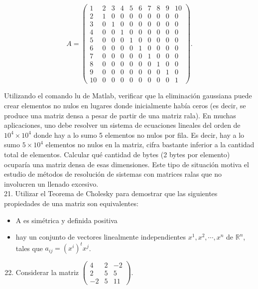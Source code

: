 \documentclass[10pt]{article}
\begin{document}
$$
A=\left(\begin{array}{rrrrrrrrrr}
1 & 2 & 3 & 4 & 5 & 6 & 7 & 8 & 9 & 10 \\
2 & 1 & 0 & 0 & 0 & 0 & 0 & 0 & 0 & 0 \\
3 & 0 & 1 & 0 & 0 & 0 & 0 & 0 & 0 & 0 \\
4 & 0 & 0 & 1 & 0 & 0 & 0 & 0 & 0 & 0 \\
5 & 0 & 0 & 0 & 1 & 0 & 0 & 0 & 0 & 0 \\
6 & 0 & 0 & 0 & 0 & 1 & 0 & 0 & 0 & 0 \\
7 & 0 & 0 & 0 & 0 & 0 & 1 & 0 & 0 & 0 \\
8 & 0 & 0 & 0 & 0 & 0 & 0 & 1 & 0 & 0 \\
9 & 0 & 0 & 0 & 0 & 0 & 0 & 0 & 1 & 0 \\
10 & 0 & 0 & 0 & 0 & 0 & 0 & 0 & 0 & 1
\end{array}\right) .
$$

Utilizando el comando lu de Matlab, verificar que la eliminación gaussiana puede crear elementos no nulos en lugares donde inicialmente había ceros (es decir, se produce una matriz densa a pesar de partir de una matriz rala). En muchas aplicaciones, uno debe resolver un sistema de ecuaciones lineales del orden de $10^{4} \times 10^{4}$ donde hay a lo sumo 5 elementos no nulos por fila. Es decir, hay a lo sumo $5 \times 10^{4}$ elementos no nulos en la matriz, cifra bastante inferior a la cantidad total de elementos. Calcular qué cantidad de bytes (2 bytes por elemento) ocuparía una matriz densa de esas dimensiones. Este tipo de situación motiva el estudio de métodos de resolución de sistemas con matrices ralas que no involucren un llenado excesivo.\\
21. Utilizar el Teorema de Cholesky para demostrar que las siguientes propiedades de una matriz son equivalentes:

\begin{itemize}
  \item A es simétrica y definida positiva
  \item hay un conjunto de vectores linealmente independientes $x^{1}, x^{2}, \cdots, x^{n}$ de $\mathbb{R}^{n}$, tales que $a_{i j}=\left(x^{i}\right)^{t} x^{j}$.
\end{itemize}

\begin{enumerate}
  \setcounter{enumi}{21}
  \item Considerar la matriz $\left(\begin{array}{ccc}4 & 2 & -2 \\ 2 & 5 & 5 \\ -2 & 5 & 11\end{array}\right)$.
\end{enumerate}
\end{document}
